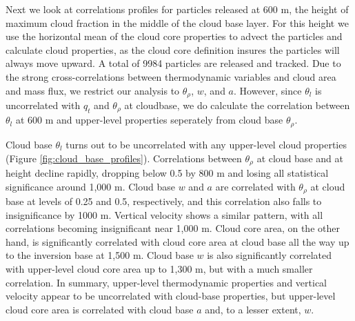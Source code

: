 \documentclass[acp]{copernicus}
\begin{document}
Next we look at correlations profiles for particles released at 600 m, the 
height of maximum cloud fraction in the middle of the cloud base layer.
For this height we use the horizontal mean of the cloud core properties to 
advect the particles and calculate cloud properties, as the cloud core 
definition insures the particles will always move upward.  A total of 
9984 particles are released and tracked.  Due to the strong cross-correlations 
between thermodynamic variables and cloud area and mass flux, we restrict our 
analysis to $\theta_\rho$, $w$, and $a$.  However, since $\theta_l$ is 
uncorrelated with $q_t$ and $\theta_\rho$ at cloudbase, we do calculate the 
correlation between $\theta_l$ at 600 m and upper-level properties seperately 
from cloud base $\theta_\rho$.

Cloud base $\theta_l$ turns out to be uncorrelated with any upper-level 
cloud properties (Figure \ref{fig:cloud_base_profiles}).  Correlations between 
$\theta_\rho$ at cloud base and at height decline rapidly, dropping below 
0.5 by 800 m and losing all statistical significance around 1,000 m.  Cloud 
base $w$ and $a$ are correlated with $\theta_\rho$ at cloud base at levels of 
0.25 and 0.5, respectively, and this correlation also falls to insignificance 
by 1000 m.  Vertical velocity shows a similar pattern, with all correlations 
becoming insignificant near 1,000 m.  Cloud core area, on the other hand, 
is significantly correlated with cloud core area at cloud base all the way up 
to the inversion base at 1,500 m.  Cloud base $w$ is also significantly 
correlated with upper-level cloud core area up to 1,300 m, but with a much 
smaller correlation.  In summary, upper-level thermodynamic properties and 
vertical velocity appear to be uncorrelated with cloud-base properties, but 
upper-level cloud core area is correlated with cloud base $a$ and, to a lesser
extent, $w$.
\end{document}

